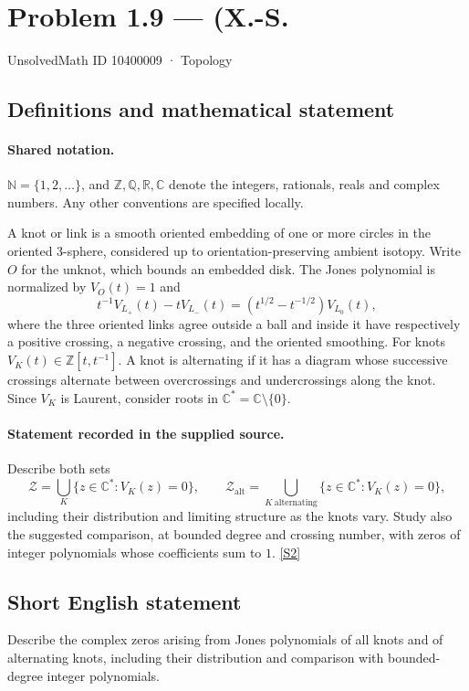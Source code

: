 \documentclass[11pt]{article}
\newcommand{\sref}[2]{\hyperlink{source:#1:#2}{[S#2]}}
\begin{document}
\setcounter{section}{10400008}
\section{Problem 1.9 — (X.-S.}\label{10400009}
{\small\sffamily UnsolvedMath ID 10400009 · Topology}
\subsection{Definitions and mathematical statement}

\paragraph{Shared notation.}$\mathbb N=\{1,2,\ldots\}$, and $\mathbb Z,\mathbb Q,\mathbb R,\mathbb C$ denote the integers, rationals, reals and complex numbers. Any other conventions are specified locally.


A knot or link is a smooth oriented embedding of one or more circles in the oriented $3$-sphere, considered up to orientation-preserving ambient isotopy. Write $O$ for the unknot, which bounds an embedded disk. The Jones polynomial is normalized by $V_O(t)=1$ and
\[t^{-1}V_{L_+}(t)-tV_{L_-}(t)=(t^{1/2}-t^{-1/2})V_{L_0}(t),\]
where the three oriented links agree outside a ball and inside it have respectively a positive crossing, a negative crossing, and the oriented smoothing. For knots $V_K(t)\in\mathbb Z[t,t^{-1}]$. A knot is alternating if it has a diagram whose successive crossings alternate between overcrossings and undercrossings along the knot. Since $V_K$ is Laurent, consider roots in $\mathbb C^*=\mathbb C\setminus\{0\}$.
\paragraph{Statement recorded in the supplied source.}
Describe both sets
\[\mathcal Z=\bigcup_{K}\{z\in\mathbb C^*:V_K(z)=0\},\qquad
\mathcal Z_{\mathrm{alt}}=\bigcup_{K\ \mathrm{alternating}}\{z\in\mathbb C^*:V_K(z)=0\},\]
including their distribution and limiting structure as the knots vary. Study also the suggested comparison, at bounded degree and crossing number, with zeros of integer polynomials whose coefficients sum to $1$. \sref{10400009}{2}
\subsection{Short English statement}
Describe the complex zeros arising from Jones polynomials of all knots and of alternating knots, including their distribution and comparison with bounded-degree integer polynomials.
\end{document}
